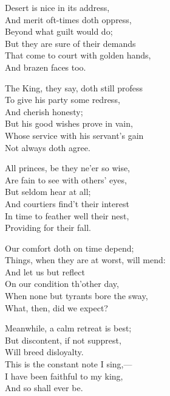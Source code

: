 \begin{dcverse}
\begin{patverse}
Desert is nice in its address,\\
And merit oft-times doth oppress,\\
Beyond what guilt would do;\\
But they are sure of their demands\\
That come to court with golden hands,\\
And brazen faces too.
\end{patverse}

\begin{patverse}
The King, they say, doth still profess\\
To give his party some redress,\\
And cherish honesty;\\
But his good wishes prove in vain,\\
Whose service with his servant’s gain\\
Not always doth agree.
\end{patverse}

\begin{patverse}
All princes, be they ne’er so wise,\\
Are fain to see with others’ eyes,\\
But seldom hear at all;\\
And courtiers find’t their interest\\
In time to feather well their nest,\\
Providing for their fall.
\end{patverse}

\begin{patverse}
Our comfort doth on time depend;\\
Things, when they are at worst, will mend:\\
And let us but reflect\\
On our condition th’other day,\\
When none but tyrants bore the sway,\\
What, then, did we expect?
\end{patverse}

\begin{patverse}
Meanwhile, a calm retreat is best;\\
But discontent, if not supprest,\\
Will breed disloyalty.\\
This is the constant note I sing,—\\
I have been faithful to my king,\\
And so shall ever be.
\end{patverse}
\end{dcverse}

